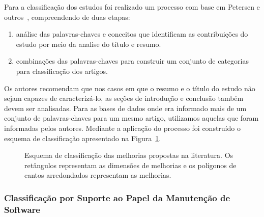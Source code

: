 Para a classificação dos estudos foi realizado um processo com base em Petersen
e outros~\cite{Petersen2008}, compreendendo de duas etapas:

\begin{enumerate}[I]
	\item análise das palavras-chaves e conceitos que
		identificam as contribuições do estudo por meio da analise do título e
		resumo.
	\item combinações das palavras-chaves para construir um conjunto de
		categorias para classificação dos artigos.
\end{enumerate}

Os autores recomendam que nos casos em que o resumo e o título do estudo não
sejam capazes de caracterizá-lo, as seções de introdução e conclusão também
devem ser analisadas. Para as bases de dados onde era informado mais de um
conjunto de palavras-chaves para um mesmo artigo, utilizamos aquelas que foram
informadas pelos autores. Mediante a aplicação do processo foi construído o
esquema de classificação apresentado na
Figura~\ref{fig:diagrama-esquema-dimensao-melhorias}.

\begin{figure}[tb] \centering
	\caption{Esquema de classificação das melhorias propostas na literatura. Os
		retângulos representam as dimensões de melhorias e os polígonos de
		cantos arredondados representam as melhorias.}
	\label{fig:diagrama-esquema-dimensao-melhorias}
\end{figure}

\subsubsection{Classificação por Suporte ao Papel da Manutenção de Software}
\label{subsubsec:map-esquema-suporte-papel-man}


